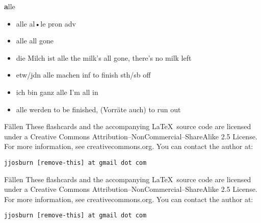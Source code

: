 \documentclass[avery5371,frame,grid]{flashcards}
\begin{document}

\begin{flashcard}[Verb]{\selectfont\Huge\textbf alle}
{\selectfont\textbf\tiny \begin{itemize} 
 \setlength\itemsep{-0.5em}
\item alle al•le pron adv  
\item alle all gone  
\item die Milch ist alle  the milk's all gone, there's no milk left  
\item etw/jdn alle machen inf   to finish sth/sb off  
\item ich bin ganz alle I'm all in  
\item alle werden to be finished, (Vorräte auch) to run out  
\end{itemize} }

\end{flashcard}

\begin{flashcard}[Verb]{\Huge Fällen}
{\large These flashcards and the accompanying \LaTeX \, source code are licensed
under a Creative Commons Attribution--NonCommercial--ShareAlike 2.5 License.  
For more information, see creativecommons.org.  You can contact the author at: }
\begin{center}
\begin{small}\tt jjosburn [remove-this] at gmail dot com\end{small}
\end{center}
\end{flashcard}

\begin{flashcard}[Verb]{\Huge Fällen}
{\large These flashcards and the accompanying \LaTeX \, source code are licensed
under a Creative Commons Attribution--NonCommercial--ShareAlike 2.5 License.  
For more information, see creativecommons.org.  You can contact the author at: }
\begin{center}
\begin{small}\tt jjosburn [remove-this] at gmail dot com\end{small}
\end{center}
\end{flashcard}
\end{document}
